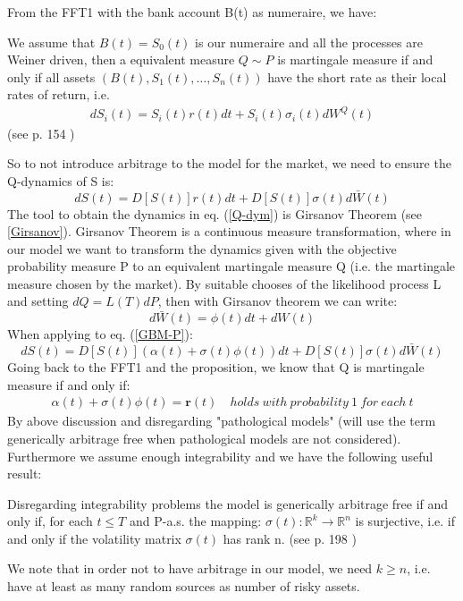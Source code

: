 From the FFT1 with the bank account B(t) as numeraire, we have:
\theoremstyle{proposition}
\begin{proposition}{}
We assume that $B(t)=S_0(t)$ is our numeraire and all the processes are Weiner driven, then a equivalent measure $Q \sim P$ is martingale measure if and only if all assets $(B(t), S_1(t), \ldots, S_n(t))$ have the short rate as their local rates of return, i.e.
\begin{align}
dS_i(t)=S_i(t)r(t)dt+S_i(t)\sigma_i(t)dW^Q(t)
\end{align}
(see p. 154 \parencite{finKont})
\end{proposition}
So to not introduce arbitrage to the model for the market, we need to ensure the Q-dynamics of S is:
\begin{equation}\label{Q-dym}
dS(t)=D[S(t)]r(t)dt+D[S(t)]\sigma(t)d\bar{W}(t)
\end{equation}
The tool to obtain the dynamics in eq. (\ref{Q-dym}) is Girsanov Theorem (see \ref{Girsanov}). Girsanov Theorem is a continuous measure transformation, where in our model we want to transform the dynamics given with the objective probability measure P to an equivalent martingale measure Q (i.e. the martingale measure chosen by the market). By suitable chooses of the likelihood process L and setting $dQ=L(T)dP$, then with Girsanov theorem we can write:
$$d\bar{W}(t)=\phi(t)dt + dW(t)$$
When applying to eq. (\ref{GBM-P}):
$$dS(t)=D[S(t)](\alpha(t)+\sigma(t)\phi(t))dt+D[S(t)]\sigma(t)d\bar{W}(t)$$
Going back to the FFT1 and the proposition, we know that Q is martingale measure if and only if:
\begin{align}\label{marketPriceOfRisk}
\alpha(t)+\sigma(t)\phi(t)=\textbf{r}(t) \quad holds \ with \ probability \ 1 \ for \ each \ t
\end{align}
By above discussion and disregarding "pathological models" (will use the term generically arbitrage free when pathological models are not considered). Furthermore we assume enough integrability and we have the following useful result:
\theoremstyle{proposition}
\begin{proposition}{}\label{arbitrageFreeProp}
Disregarding integrability problems the model is generically arbitrage free if and only if, for each $t\leq T$ and P-a.s. the mapping:
$\sigma(t):\mathbb{R}^k \to \mathbb{R}^n$ is surjective, i.e. if and only if the volatility matrix $\sigma(t)$ has rank n.
(see p. 198 \parencite{finKont})
\end{proposition}
We note that in order not to have arbitrage in our model, we need $k\geq n$, i.e. have at least as many random sources as number of risky assets.

